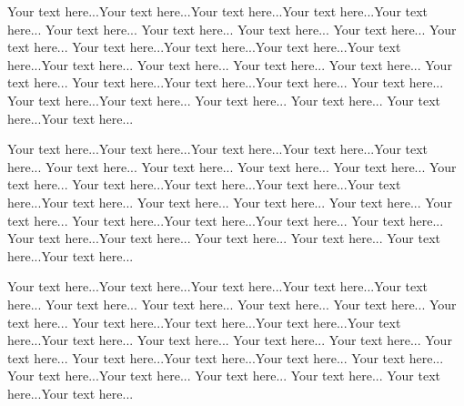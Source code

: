 \documentclass[accepted,single]{gipaper}
\begin{document}
Your text here...Your text here...Your text here...Your text
here...Your text here... Your text here... Your text here... Your
text here... Your text here... Your text here... Your text
here...Your text here...Your text here...Your text here...Your
text here... Your text here... Your text here... Your text here...
Your text here... Your text here...Your text here...Your text
here... Your text here... Your text here...Your text here... Your
text here... Your text here... Your text here...Your text here...

Your text here...Your text here...Your text here...Your text
here...Your text here... Your text here... Your text here... Your
text here... Your text here... Your text here... Your text
here...Your text here...Your text here...Your text here...Your
text here... Your text here... Your text here... Your text here...
Your text here... Your text here...Your text here...Your text
here... Your text here... Your text here...Your text here... Your
text here... Your text here... Your text here...Your text here...

Your text here...Your text here...Your text here...Your text
here...Your text here... Your text here... Your text here... Your
text here... Your text here... Your text here... Your text
here...Your text here...Your text here...Your text here...Your
text here... Your text here... Your text here... Your text here...
Your text here... Your text here...Your text here...Your text
here... Your text here... Your text here...Your text here... Your
text here... Your text here... Your text here...Your text here...





\end{document}
